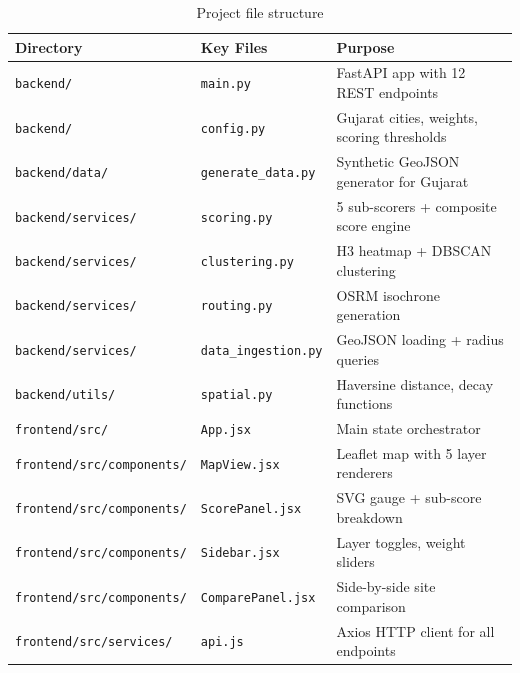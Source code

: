 \documentclass[12pt, a4paper]{article}
\begin{document}
\begin{table}[H]
\centering
\small
\begin{tabularx}{\textwidth}{l l X}
    \toprule
    \textbf{Directory} & \textbf{Key Files} & \textbf{Purpose} \\
    \midrule
    \texttt{backend/}          & \texttt{main.py}           & FastAPI app with 12 REST endpoints \\
    \texttt{backend/}          & \texttt{config.py}         & Gujarat cities, weights, scoring thresholds \\
    \texttt{backend/data/}     & \texttt{generate\_data.py} & Synthetic GeoJSON generator for Gujarat \\
    \texttt{backend/services/} & \texttt{scoring.py}        & 5 sub-scorers + composite score engine \\
    \texttt{backend/services/} & \texttt{clustering.py}     & H3 heatmap + DBSCAN clustering \\
    \texttt{backend/services/} & \texttt{routing.py}        & OSRM isochrone generation \\
    \texttt{backend/services/} & \texttt{data\_ingestion.py} & GeoJSON loading + radius queries \\
    \texttt{backend/utils/}    & \texttt{spatial.py}        & Haversine distance, decay functions \\
    \texttt{frontend/src/}     & \texttt{App.jsx}           & Main state orchestrator \\
    \texttt{frontend/src/components/} & \texttt{MapView.jsx}  & Leaflet map with 5 layer renderers \\
    \texttt{frontend/src/components/} & \texttt{ScorePanel.jsx} & SVG gauge + sub-score breakdown \\
    \texttt{frontend/src/components/} & \texttt{Sidebar.jsx}    & Layer toggles, weight sliders \\
    \texttt{frontend/src/components/} & \texttt{ComparePanel.jsx} & Side-by-side site comparison \\
    \texttt{frontend/src/services/}   & \texttt{api.js}          & Axios HTTP client for all endpoints \\
    \bottomrule
\end{tabularx}
\caption{Project file structure}
\end{table}

\newpage

\end{document}
